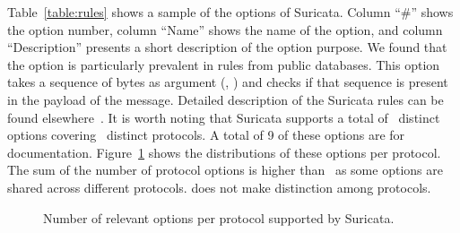 \documentclass[sigconf,anonymous]{acmart}
\begin{document}
Table~\ref{table:rules} shows a sample of the options of
Suricata. Column ``\#'' shows the option number, column ``Name'' shows
the name of the option, and column ``Description'' presents a short
description of the option purpose. We found that the option
 is particularly prevalent in rules from public
databases. This
option takes a sequence of bytes as argument (\eg{},
) and checks if that sequence is present
in the payload of the message. Detailed description of the Suricata
rules can be found elsewhere~\cite{suri-rule-format}. It is worth
noting that Suricata supports a total of \totoptions\ distinct options
covering \numproto\ distinct protocols. A total of 9 of these options
are for documentation.
Figure~\ref{fig:distribution-rules-protocol} shows the distributions
of these options per protocol. The sum of the number of protocol
options is higher than \totoptions\ as some options are shared across
different protocols. \tname{} does not make distinction among protocols.


\begin{figure}[t!]
  \centering
  \vspace{-2ex}
  \caption{\label{fig:distribution-rules-protocol}Number of relevant
    options per protocol supported by Suricata.}
\end{figure}
  
\end{document}
